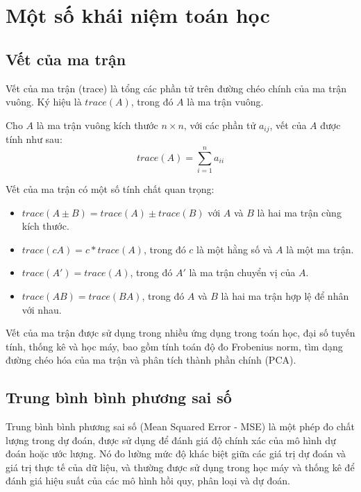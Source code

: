 \section{Một số khái niệm toán học}
\subsection{Vết của ma trận}
\begin{definition}
	Vết của ma trận (trace) là tổng các phần tử trên đường chéo chính của ma trận vuông. Ký hiệu là $trace(A)$, trong đó $A$ là ma trận vuông.
	
	Cho $A$ là ma trận vuông kích thước $n\times n$, với các phần tử $a_{ij}$, vết của $A$ được tính như sau:
	\begin{equation}
		trace(A) = \sum\limits_{i=1}^n a_{ii}
	\end{equation}
\end{definition}
Vết của ma trận có một số tính chất quan trọng:
\begin{itemize}
	\item $trace(A \pm B) = trace(A) \pm trace(B)$ với $A$ và $B$ là hai ma trận cùng kích thước.
	\item $trace(cA) = c * trace(A)$, trong đó $c$ là một hằng số và $A$ là một ma trận.
	\item $trace(A') = trace(A)$, trong đó $A'$ là ma trận chuyển vị của $A$.
	\item $trace(AB) = trace(BA)$, trong đó $A$ và $B$ là hai ma trận hợp lệ để nhân với nhau.
\end{itemize}

Vết của ma trận được sử dụng trong nhiều ứng dụng trong toán học, đại số tuyến tính, thống kê và học máy, bao gồm tính toán độ đo Frobenius norm, tìm dạng đường chéo hóa của ma trận và phân tích thành phần chính (PCA).

\subsection{Trung bình bình phương sai số}
Trung bình bình phương sai số (Mean Squared Error - MSE) là một phép đo chất lượng trong dự đoán, được sử dụng để đánh giá độ chính xác của mô hình dự đoán hoặc ước lượng. Nó đo lường mức độ khác biệt giữa các giá trị dự đoán và giá trị thực tế của dữ liệu, và thường được sử dụng trong học máy và thống kê để đánh giá hiệu suất của các mô hình hồi quy, phân loại và dự đoán.

